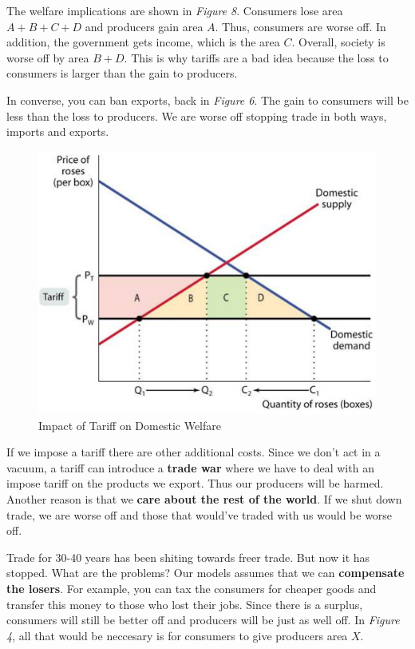 \documentclass{article}
\begin{document}
The welfare implications are shown in \textit{Figure 8}. Consumers lose area
$A+B+C+D$ and producers gain area $A$. Thus, consumers are worse off. In addition,
the government gets income, which is the area $C$. Overall, society is worse off
by area $B+D$. This is why tariffs are a bad idea because the loss to consumers
is larger than the gain to producers.

In converse, you can ban exports, back in \textit{Figure 6}. The gain to
consumers will be less than the loss to producers. We are worse off stopping
trade in both ways, imports and exports.

\begin{figure}[H]
    \centering
    \includegraphics[scale=0.9]{"Figure 8"}
    \caption{Impact of Tariff on Domestic Welfare}
\end{figure}

If we impose a tariff there are other additional costs. Since we don't act in a
vacuum, a tariff can introduce a \textbf{trade war} where we have to deal with
an impose tariff on the products we export. Thus our producers will be harmed.
Another reason is that we \textbf{care about the rest of the world}. If we shut
down trade, we are worse off and those that would've traded with us would be
worse off.

Trade for 30-40 years has been shiting towards freer trade. But now it has
stopped. What are the problems? Our models assumes that we can
\textbf{compensate the losers}. For example, you can tax the consumers for
cheaper goods and transfer this money to those who lost their jobs. Since there
is a surplus, consumers will still be better off and producers will be just as
well off. In \textit{Figure 4}, all that would be neccesary is for consumers to
give producers area $X$.
\end{document}
